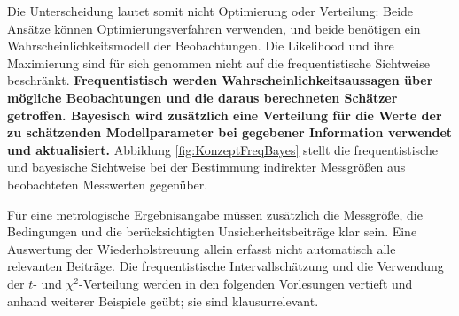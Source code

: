 Die Unterscheidung lautet somit nicht \glqq Optimierung oder Verteilung\grqq:
Beide Ansätze können Optimierungsverfahren verwenden, und beide
benötigen ein Wahrscheinlichkeitsmodell der Beobachtungen. Die
Likelihood und ihre Maximierung sind für sich genommen nicht
auf die frequentistische Sichtweise beschränkt.
\textbf{Frequentistisch werden Wahrscheinlichkeits\-aussagen über mögliche
Beobachtungen und die daraus berechneten Schätzer getroffen.
Bayesisch wird zusätzlich eine Verteilung für die Werte der
zu schätzenden Modellparameter bei gegebener \mbox{Information} verwendet
und aktualisiert.} Abbildung \ref{fig:KonzeptFreqBayes} stellt die frequentistische und bayesische Sichtweise bei der Bestimmung
indirekter Messgrößen aus beobachteten Messwerten gegenüber.

Für eine metrologische Ergebnisangabe müssen zusätzlich die Messgröße,
die Bedingungen und die berücksichtigten Unsicherheitsbeiträge klar sein.
Eine Auswertung der Wiederholstreuung allein erfasst nicht automatisch
alle relevanten Beiträge. Die frequentistische Intervallschätzung und
die Verwendung der $t$- und $\chi^2$-Verteilung werden in den folgenden
Vorlesungen vertieft und anhand weiterer Beispiele geübt; sie sind
klausurrelevant.

